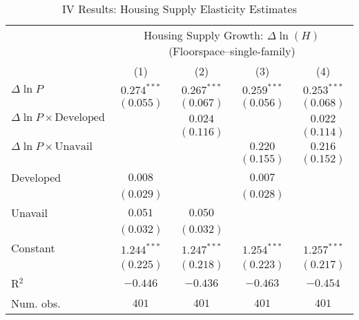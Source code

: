 
\begin{table}
\caption{IV Results: Housing Supply Elasticity Estimates}
\begin{center}
\begin{footnotesize}
\begin{threeparttable}
\begin{tabular}{l c c c c}
\toprule
 & \multicolumn{4}{c}{Housing Supply Growth: $\Delta\ln(H)$ (Floorspace--single-family)} \\
\cmidrule(lr){2-5}
 & (1) & (2) & (3) & (4) \\
\midrule
$\Delta\ln P$                         & $0.274^{***}$ & $0.267^{***}$ & $0.259^{***}$ & $0.253^{***}$ \\
                                      & $(0.055)$     & $(0.067)$     & $(0.056)$     & $(0.068)$     \\
$\Delta\ln P\times{\text{Developed}}$ &               & $0.024$       &               & $0.022$       \\
                                      &               & $(0.116)$     &               & $(0.114)$     \\
$\Delta\ln P\times{\text{Unavail}}$   &               &               & $0.220$       & $0.216$       \\
                                      &               &               & $(0.155)$     & $(0.152)$     \\
Developed                             & $0.008$       &               & $0.007$       &               \\
                                      & $(0.029)$     &               & $(0.028)$     &               \\
Unavail                               & $0.051$       & $0.050$       &               &               \\
                                      & $(0.032)$     & $(0.032)$     &               &               \\
Constant                              & $1.244^{***}$ & $1.247^{***}$ & $1.254^{***}$ & $1.257^{***}$ \\
                                      & $(0.225)$     & $(0.218)$     & $(0.223)$     & $(0.217)$     \\
\midrule
R$^2$                                 & $-0.446$      & $-0.436$      & $-0.463$      & $-0.454$      \\
Num. obs.                             & $401$         & $401$         & $401$         & $401$         \\

\end{tabular}
\end{threeparttable}
\end{footnotesize}
\end{center}
\end{table}
